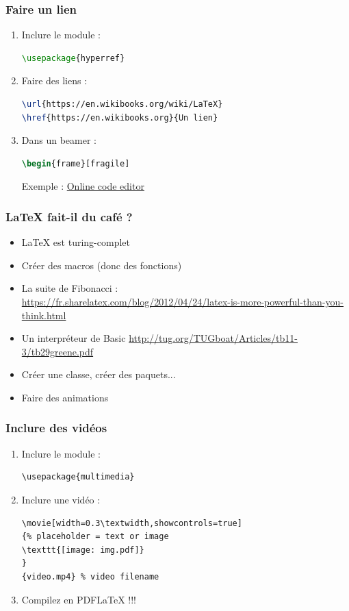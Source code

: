 \documentclass{beamer}
\begin{document}
\begin{frame}[fragile]
    \frametitle{Faire un lien}
    \begin{enumerate}
        \item<1-> Inclure le module :
        \begin{lstlisting}[language=TeX]
\usepackage{hyperref}
        \end{lstlisting}
        \item<2-> Faire des liens :
        \begin{lstlisting}[language=TeX]
\url{https://en.wikibooks.org/wiki/LaTeX}
\href{https://en.wikibooks.org}{Un lien}
        \end{lstlisting}
        \item<3-> Dans un beamer :
        \begin{lstlisting}[language=TeX]
\begin{frame}[fragile]
        \end{lstlisting}
        Exemple : \href{https://www.codecogs.com/latex/eqneditor.php}{Online code editor}
    \end{enumerate}
\end{frame}

\begin{frame}
    \frametitle{LaTeX fait-il du café ?}
    \begin{itemize}
        \item<1-> LaTeX est turing-complet
        \item<2-> Créer des macros (donc des fonctions)        
        \item<3-> La suite de Fibonacci :\\
        \url{https://fr.sharelatex.com/blog/2012/04/24/latex-is-more-powerful-than-you-think.html}
        \item<4-> Un interpréteur de Basic
        \url{http://tug.org/TUGboat/Articles/tb11-3/tb29greene.pdf}
        \item<5-> Créer une classe, créer des paquets...
        \item<6-> Faire des animations
    \end{itemize}
\end{frame}

\begin{frame}[fragile]
    \frametitle{Inclure des vidéos}
       \begin{enumerate}
       \item<1-> Inclure le module :
     \begin{lstlisting}
\usepackage{multimedia}      
     \end{lstlisting}
       \item<2-> Inclure une vidéo :
     \begin{lstlisting}
\movie[width=0.3\textwidth,showcontrols=true]
{% placeholder = text or image
\texttt{[image: img.pdf]}
}
{video.mp4} % video filename
       \end{lstlisting}
       \item<3-> Compilez en PDFLaTeX !!!
    \end{enumerate}

\end{frame}
\end{document}
